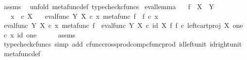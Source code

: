 \begin{isabellebody}
\isamarkupfalse%
\ assms\ \isamarkupfalse%
\ {\isacharparenleft}{\kern0pt}unfold\ metafunc{\isacharunderscore}{\kern0pt}def{}{\isacharcomma}{\kern0pt}\ typecheck{\isacharunderscore}{\kern0pt}cfuncs{\isacharparenright}{\kern0pt}%
\endisatagproof
{\isafoldproof}%
%
\isadelimproof
\isanewline
%
\endisadelimproof
\isanewline
{}\isamarkupfalse%
\ eval{\isacharunderscore}{\kern0pt}lemma{\isacharcolon}{\kern0pt}\isanewline
\ \ \ {\isachardoublequoteopen}f\ {\isacharcolon}{\kern0pt}\ X\ {\isasymrightarrow}\ Y{\isachardoublequoteclose}\isanewline
\ \ \ {\isachardoublequoteopen}x\ \ {\isasymin}\isactrlsub c\ X{\isachardoublequoteclose}\isanewline
\ \ \ {\isachardoublequoteopen}eval{\isacharunderscore}{\kern0pt}func\ Y\ X\ {\isasymcirc}\isactrlsub c\ {\isasymlangle}x{\isacharcomma}{\kern0pt}\ metafunc\ f{\isasymrangle}\ {\isacharequal}{\kern0pt}\ f\ {\isasymcirc}\isactrlsub c\ x{\isachardoublequoteclose}\isanewline
%
\isadelimproof
%
\endisadelimproof
%
\isatagproof
{}\isamarkupfalse%
\ {\isacharminus}{\kern0pt}\ \isanewline
\ \ \isamarkupfalse%
\ {\isachardoublequoteopen}eval{\isacharunderscore}{\kern0pt}func\ Y\ X\ {\isasymcirc}\isactrlsub c\ {\isasymlangle}x{\isacharcomma}{\kern0pt}\ metafunc\ f{\isasymrangle}\ {\isacharequal}{\kern0pt}\ eval{\isacharunderscore}{\kern0pt}func\ Y\ X\ {\isasymcirc}\isactrlsub c\ {\isacharparenleft}{\kern0pt}id\ X\ {\isasymtimes}\isactrlsub f\ {\isacharparenleft}{\kern0pt}f\ {\isasymcirc}\isactrlsub c\ {\isacharparenleft}{\kern0pt}left{\isacharunderscore}{\kern0pt}cart{\isacharunderscore}{\kern0pt}proj\ X\ one{\isacharparenright}{\kern0pt}{\isacharparenright}{\kern0pt}\isactrlsup {\isasymsharp}{\isacharparenright}{\kern0pt}\ {\isasymcirc}\isactrlsub c\ {\isasymlangle}x{\isacharcomma}{\kern0pt}\ id\ one{\isasymrangle}{\isachardoublequoteclose}\isanewline
\ \ \ \ \isamarkupfalse%
\ assms\ \isamarkupfalse%
\ {\isacharparenleft}{\kern0pt}typecheck{\isacharunderscore}{\kern0pt}cfuncs{\isacharcomma}{\kern0pt}\ simp\ add{\isacharcolon}{\kern0pt}\ cfunc{\isacharunderscore}{\kern0pt}cross{\isacharunderscore}{\kern0pt}prod{\isacharunderscore}{\kern0pt}comp{\isacharunderscore}{\kern0pt}cfunc{\isacharunderscore}{\kern0pt}prod\ id{\isacharunderscore}{\kern0pt}left{\isacharunderscore}{\kern0pt}unit{}\ id{\isacharunderscore}{\kern0pt}right{\isacharunderscore}{\kern0pt}unit{}\ metafunc{\isacharunderscore}{\kern0pt}def{}{\isacharparenright}{\kern0pt}\isanewline

\end{isabellebody}
